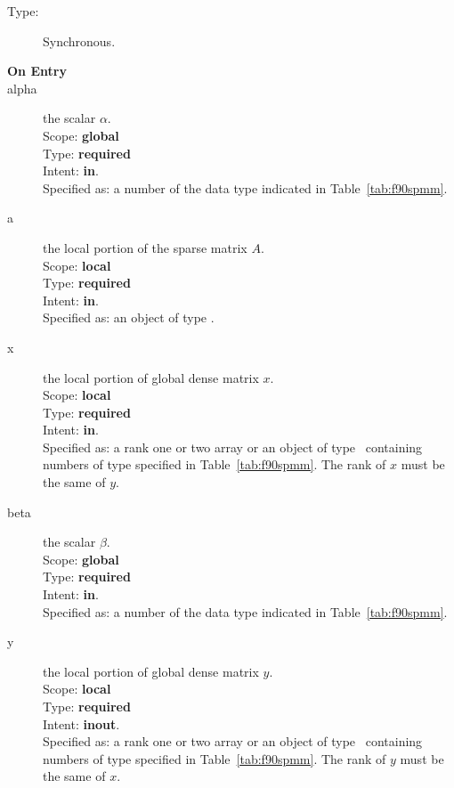 \begin{description}
\item[Type:] Synchronous.
\item[\bf On Entry]
\item[alpha] the scalar $\alpha$.\\
Scope: {\bf global} \\
Type: {\bf required}\\
Intent: {\bf in}.\\
Specified as: a number of the data type indicated in
Table~\ref{tab:f90spmm}.
\item[a] the local portion of the sparse matrix
$A$. \\
Scope: {\bf local} \\
Type: {\bf required}\\
Intent: {\bf in}.\\
Specified as: an object of type \spdata.
\item[x] the local portion of global dense matrix
$x$. %
\\
Scope: {\bf local} \\
Type: {\bf required} \\
Intent: {\bf in}.\\
Specified as:  a rank one or two array or an object of type \vdata\
containing numbers of type specified in
Table~\ref{tab:f90spmm}.  The rank of $x$ must be the same of $y$.
\item[beta] the scalar $\beta$.\\
Scope: {\bf global} \\
Type: {\bf required} \\
Intent: {\bf in}.\\
Specified as: a number of the data type indicated in Table~\ref{tab:f90spmm}.
\item[y] the local portion of global dense matrix
$y$. %
\\
Scope: {\bf local} \\
Type: {\bf required} \\
Intent: {\bf inout}.\\
Specified as:  a rank one or two array or an object of type \vdata\
containing numbers of type specified in
Table~\ref{tab:f90spmm}. The rank of $y$ must be the same of $x$.

\end{description}
